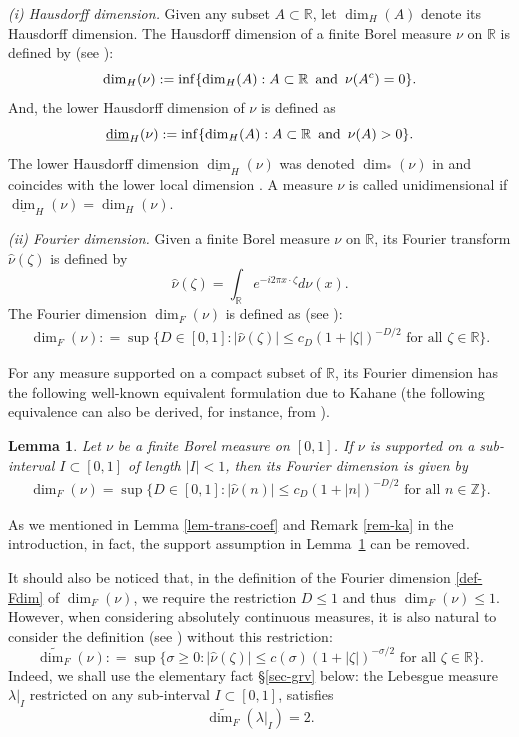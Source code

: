 \documentclass[12pt]{amsart}
\newtheorem{lemma}[theorem]{Lemma}
\theoremstyle{definition}
\theoremstyle{remark}
\newcommand{\R}{\mathbb{R}}
\newcommand{\Z}{\mathbb{Z}}
\newcommand{\an}{\text{\, and \,}}
\numberwithin{equation}{section}
\begin{document}
{\flushleft \it (i) Hausdorff dimension.} Given any subset $A\subset \R$, let $\dim_H(A)$ denote its Hausdorff dimension.  The Hausdorff dimension of a finite Borel measure $\nu$ on $\R$ is defined by  (see \cite[Section 1.9, pp. 42--43]{BBS}): 
\[
\dim_H(\nu):= \inf\{\dim_H(A):    A\subset \R \an    \nu(A^c) = 0 \}. 
\]
And, the lower Hausdorff dimension of $\nu$ is defined as 
\[
\underline{\dim}_H(\nu):= \inf\{\dim_H(A):    A\subset \R \an    \nu(A) > 0 \}. 
\]
The lower Hausdorff dimension $\underline{\dim}_H(\nu)$ was denoted   $\dim_{*} (\nu)$ in \cite{Fan-aihua-lq} and coincides with the lower local dimension \cite[Theorem 1.2]{Fan-dimension}.  A measure $\nu$ is called unidimensional if $\underline{\dim}_H(\nu) = \dim_H(\nu)$. 


{\flushleft \it (ii) Fourier dimension.} Given  a finite Borel measure $\nu$ on $\R$, its   Fourier transform  $\widehat{\nu}(\zeta)$ is defined by 
\[
\widehat{\nu}(\zeta)  = \int_\R  e^{-i 2 \pi x \cdot \zeta} d\nu(x). 
\] 
The Fourier dimension $\dim_F(\nu)$ is defined as  (see \cite[Section 8.2, p. 231]{BBS}): 
\begin{align}\label{def-Fdim}
\dim_F(\nu):  = \sup\Big\{ D \in [0, 1]: \text{$| \widehat{\nu}(\zeta)| \le c_D (1+ |\zeta|)^{-  D /2}$ for all $\zeta \in \R$} \Big\}.
\end{align}



For any measure supported on a compact subset of $\R$,  its  Fourier dimension has the following well-known equivalent formulation due to Kahane \cite[Lemma 1, p. 252]{Kahane-book} (the following equivalence can also be derived, for instance, from \cite[Lemma 9.A.4]{Wolff}). 
\begin{lemma}\label{lem-Kahane}
Let $\nu$ be a finite Borel measure  on $[0,1]$. If $\nu$  is supported on  a sub-interval $I\subset [0,1]$ of length $|I|<1$,  then its Fourier dimension is given by 
\begin{align}\label{Fdim-lattice}
\dim_F(\nu)= \sup\Big\{D \in [0, 1]: \text{$| \widehat{\nu}(n)| \le c_D (1+ |n|)^{-  D /2}$ for all $n \in  \Z$} \Big\}.
\end{align}
\end{lemma}

As we mentioned in Lemma \ref{lem-trans-coef} and Remark \ref{rem-ka} in the introduction, in fact,  the support assumption in Lemma~\ref{lem-Kahane}  can be removed. 


It should also be noticed that, in the definition of the Fourier dimension \eqref{def-Fdim} of $\dim_F(\nu)$, we require the restriction  $D \le 1$ and thus $\dim_F(\nu)\le 1$.   However, when considering absolutely continuous measures, it is also natural to consider the definition (see \cite[formula (8.14), p. 233]{BBS}) without this  restriction: 
\[
\widetilde{\dim_F}(\nu): = \sup\Big\{\sigma \ge 0: \text{$| \widehat{\nu}(\zeta)| \le c(\sigma) (1+ |\zeta|)^{-  \sigma /2}$ for all $\zeta \in \R$} \Big\}. 
\]
Indeed, we shall use the elementary fact \S \ref{sec-grv} below:  the Lebesgue measure $\lambda|_I$ restricted on any sub-interval  $I\subset [0,1]$,  satisfies
\[
\widetilde{\dim_F}(\lambda|_I)= 2. 
\]
\end{document}
